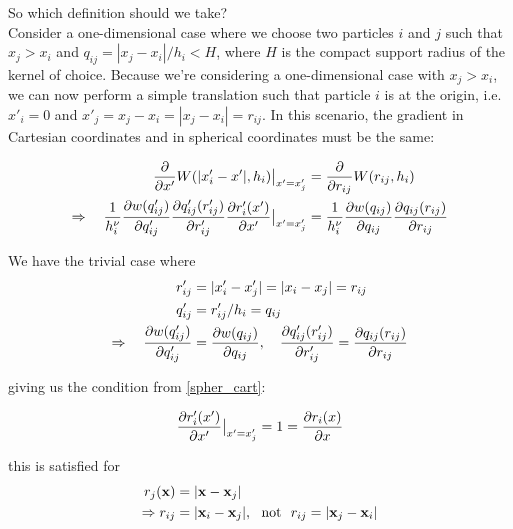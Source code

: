 So which definition should we take? \\


Consider a one-dimensional case where we choose two particles $i$ and $j$ such that $x_j > x_i$ and $q_{ij} = | x_j - x_i | / h_i < H$, where $H$ is the compact support radius of the kernel of choice.
Because we're considering a one-dimensional case with $x_j > x_i$, we can now perform a simple translation such that particle $i$ is at the origin, i.e. $x'_i = 0$ and $x'_j = x_j - x_i = | x_j - x_i | = r_{ij}$.
In this scenario, the gradient in Cartesian coordinates and in spherical coordinates must be the same:


\begin{align}
	\frac{\del}{\del x'} W (|x_i' - x'|, h_i)  \big{|}_{x' = x_j' } &= \frac{\del}{\del r_{ij}} W (r_{ij}, h_i) 		\nonumber\\
%
	\Rightarrow \quad \frac{1}{h_i^\nu} \frac{\del w(q'_{ij})}{\del q'_{ij}} \frac{\del q'_{ij}(r'_{ij})}{\del r'_{ij}} \frac{\del r'_{i}(x')}{\del x'}	  \big{|}_{x' = x_j' }  &=
		\frac{1}{h_i^\nu} \frac{\del w(q_{ij})}{\del q_{ij}} \frac{\del q_{ij}(r_{ij})}{\del r_{ij}}				\label{spher_cart}
\end{align}




We have the trivial case where
\begin{align*}
	r'_{ij} &= |x_i' - x_j'| = | x_i - x_j | = r_{ij} \\
	q'_{ij} &= r'_{ij}/h_i = q_{ij} \\
	\Rightarrow \quad \frac{\partial w(q'_{ij})}{\partial q'_{ij}} &= \frac{\partial w(q_{ij})}{\partial q_{ij}}, \quad \frac{\partial q'_{ij}(r'_{ij})}{\partial r'_{ij}} = \frac{\partial q_{ij}(r_{ij})}{\partial r_{ij}}
\end{align*}



giving us the condition from \ref{spher_cart}:






\begin{equation}
	\frac{\partial r'_{i}(x')}{\partial x'}	  \big{|}_{x' = x_j' } = 1 = \frac{\partial r_{i}(x)}{\partial x}
\end{equation}


this is satisfied for
\begin{align*}
	r_j(\mathbf{x}) &= | \mathbf{x} - \mathbf{x}_j | \\ 
	\Rightarrow r_{ij} &= | \mathbf{x}_i - \mathbf{x}_j |,\ \text{ not } \ r_{ij} = | \mathbf{x}_j - \mathbf{x}_i |
\end{align*}
















